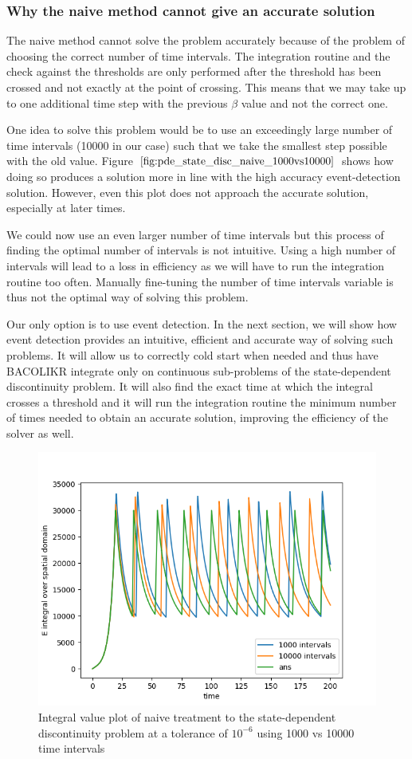 \documentclass{article}
\begin{document}
\subsubsection{Why the naive method cannot give an accurate solution}
\label{subsubsection:pde_state_naive_always_inaccurate}
The naive method cannot solve the problem accurately because of the problem of choosing the correct number of time intervals. The integration routine and the check against the thresholds are only performed after the threshold has been crossed and not exactly at the point of crossing. This means that we may take up to one additional time step with the previous $\beta$ value and not the correct one.

One idea to solve this problem would be to use an exceedingly large number of time intervals (10000 in our case) such that we take the smallest step possible with the old value. Figure $\ref{fig:pde_state_disc_naive_1000vs10000}$ shows how doing so produces a solution more in line with the high accuracy event-detection solution. However, even this plot does not approach the accurate solution, especially at later times. 

We could now use an even larger number of time intervals but this process of finding the optimal number of intervals is not intuitive. Using a high number of intervals will lead to a loss in efficiency as we will have to run the integration routine too often. Manually fine-tuning the number of time intervals variable is thus not the optimal way of solving this problem. 

Our only option is to use event detection. In the next section, we will show how event detection provides an intuitive, efficient and accurate way of solving such problems. It will allow us to correctly cold start when needed and thus have BACOLIKR integrate only on continuous sub-problems of the state-dependent discontinuity problem. It will also find the exact time at which the integral crosses a threshold and it will run the integration routine the minimum number of times needed to obtain an accurate solution, improving the efficiency of the solver as well.

\begin{figure}[H]
\centering
\includegraphics[width=0.7\linewidth]{./figures/pde_state_disc_naive_1000vs10000}
\caption{Integral value plot of naive treatment to the state-dependent discontinuity problem at a tolerance of $10^{-6}$ using 1000 vs 10000 time intervals}
\label{fig:pde_state_disc_naive_1000vs10000}
\end{figure}
\end{document}
